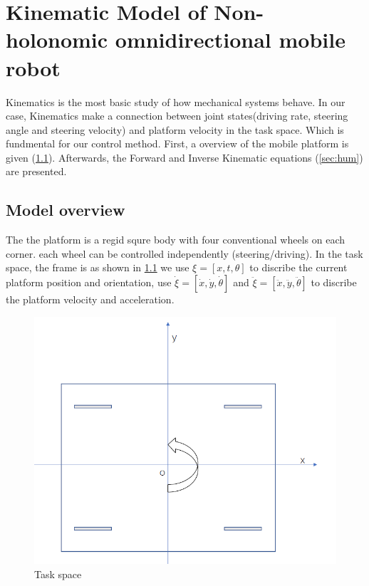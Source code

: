 \chapter{Kinematic Model of Non-holonomic omnidirectional mobile robot}
\label{cha:Kinematic}

Kinematics is the most basic study of how mechanical systems behave. In our case, Kinematics make a connection between joint states(driving rate, steering angle and steering velocity) and platform velocity in the 
task space. Which is fundmental for our control method.
First, a overview of the mobile platform is given (\cref{sec:model_overview}).
Afterwards, the Forward and Inverse Kinematic equations (\cref{sec:hum}) are presented.

\section{Model overview}
\label{sec:model_overview}

The the platform is a regid squre body with four conventional wheels on each corner. each wheel can be controlled independently (steering/driving). In the task space, the frame is as shown in \cref{fig:taskSpace} we 
use $ \xi = [x,t,\theta]$ to discribe the current platform position and orientation, use $ \dot{\xi} = [\dot{x},\dot{y},\dot{\theta}]$ and $ \ddot{\xi}= [\ddot{x},\ddot{y},\ddot{\theta}]$ to discribe the platform 
velocity and acceleration.

\begin{figure}[t]
	\begin{center}
	\includegraphics[width=\textwidth]{../Figures/Xi.png}
	\caption{Task space}
	\label{fig:taskSpace}
	\end{center}
\end{figure}


